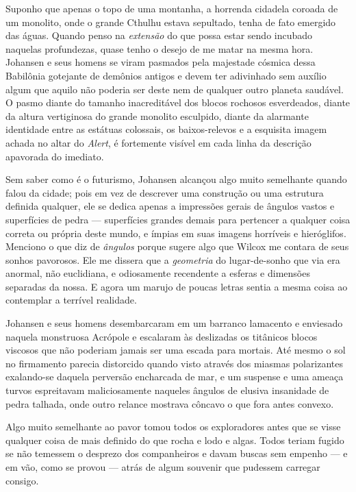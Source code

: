 Suponho que apenas o topo de uma montanha, a horrenda cidadela coroada
de um monolito, onde o grande Cthulhu estava sepultado, tenha de fato
emergido das águas. Quando penso na \emph{extensão} do que possa estar
sendo incubado naquelas profundezas, quase tenho o desejo de me matar na
mesma hora. Johansen e seus homens se viram pasmados pela majestade
cósmica dessa Babilônia gotejante de demônios antigos e devem ter
adivinhado sem auxílio algum que aquilo não poderia ser deste nem de
qualquer outro planeta saudável. O pasmo diante do tamanho inacreditável
dos blocos rochosos esverdeados, diante da altura vertiginosa do grande
monolito esculpido, diante da alarmante identidade entre as estátuas
colossais, os baixos-relevos e a esquisita imagem achada no altar do
\emph{Alert}, é fortemente visível em cada linha da descrição apavorada
do imediato.

Sem saber como é o futurismo, Johansen alcançou algo muito semelhante
quando falou da cidade; pois em vez de descrever uma construção ou uma
estrutura definida qualquer, ele se dedica apenas a impressões gerais de
ângulos vastos e superfícies de pedra --- superfícies grandes demais
para pertencer a qualquer coisa correta ou própria deste mundo, e ímpias
em suas imagens horríveis e hieróglifos. Menciono o que diz de
\emph{ângulos} porque sugere algo que Wilcox me contara de seus sonhos
pavorosos. Ele me dissera que a \emph{geometria} do lugar-de-sonho que
via era anormal, não euclidiana, e odiosamente recendente a esferas e
dimensões separadas da nossa. E agora um marujo de poucas letras sentia
a mesma coisa ao contemplar a terrível realidade.

Johansen e seus homens desembarcaram em um barranco lamacento e
enviesado naquela monstruosa Acrópole e escalaram às deslizadas os
titânicos blocos viscosos que não poderiam jamais ser uma escada para
mortais. Até mesmo o sol no firmamento parecia distorcido quando visto
através dos miasmas polarizantes exalando-se daquela perversão
encharcada de mar, e um suspense e uma ameaça turvos espreitavam
maliciosamente naqueles ângulos de elusiva insanidade de pedra talhada,
onde outro relance mostrava côncavo o que fora antes convexo.

Algo muito semelhante ao pavor tomou todos os exploradores antes que se
visse qualquer coisa de mais definido do que rocha e lodo e algas. Todos
teriam fugido se não temessem o desprezo dos companheiros e davam
buscas sem empenho --- e em vão, como se provou --- atrás de algum souvenir que pudessem carregar consigo.

